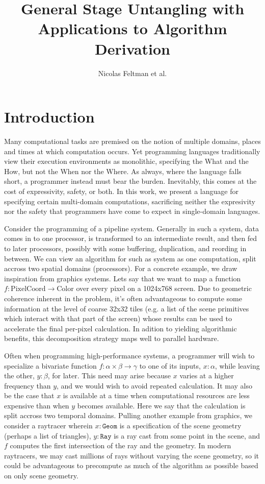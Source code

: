 \documentclass{article}
\title{\Large\textbf{General Stage Untangling with Applications to Algorithm Derivation}}
\author{Nicolas Feltman et al.}
\begin{document}
\maketitle
\section{Introduction}

Many computational tasks are premised on the notion of multiple domains, places and times at which computation occurs.  Yet programming languages traditionally view their execution environments as monolithic, specifying the What and the How, but not the When nor the Where.   As always, where the language falls short, a programmer instead must bear the burden.  Inevitably, this comes at the cost of expressivity, safety, or both.  In this work, we present a language for specifying certain multi-domain computations, sacrificing neither the expresivity nor the safety that programmers have come to expect in single-domain languages.

Consider the programming of a pipeline system.  Generally in such a system, data comes in to one processor, is transformed to an intermediate result, and then fed to later processors, possibly with some buffering, duplication, and reording in between.  We can view an algorithm for such as system as one computation, split accross two spatial domains (processors).  For a concrete example, we draw inspiration from graphics systems.  Lets say that we want to map a function $f : \mathrm{PixelCoord} \to \mathrm{Color}$ over every pixel on a 1024x768 screen.   Due to geometric coherence inherent in the problem, it's often advantageous to compute some information at the level of coarse 32x32 tiles (e.g. a list of the scene primitives which interact with that part of the screen) whose results can be used to accelerate the final per-pixel calculation.  In adition to yielding algorithmic benefits, this decomposition strategy maps well to parallel hardware.

Often when programming high-performance systems, a programmer will wish to specialize a bivariate function $f : \alpha \times \beta \to \gamma$ to one of its inputs, $x : \alpha$, while leaving the other, $y : \beta$, for later.  This need may arise because $x$ varies at a higher frequency than $y$, and we would wish to avoid repeated calculation. It may also be the case that $x$ is available at a time when computational resources are less expensive than when $y$ becomes available.  Here we say that the calculation is split accross two temporal domains.  Pulling another example from graphics, we consider a raytracer wherein $x : \mathtt{Geom}$ is a specification of the scene geometry (perhaps a list of triangles), $y : \mathtt{Ray}$ is a ray cast from some point in the scene, and $f$ computes the first intersection of the ray and the geometry.  In modern raytracers, we may cast millions of rays without varying the scene geometry, so it could be advantageous to precompute as much of the algorithm as possible based on only scene geometry.
\end{document}
